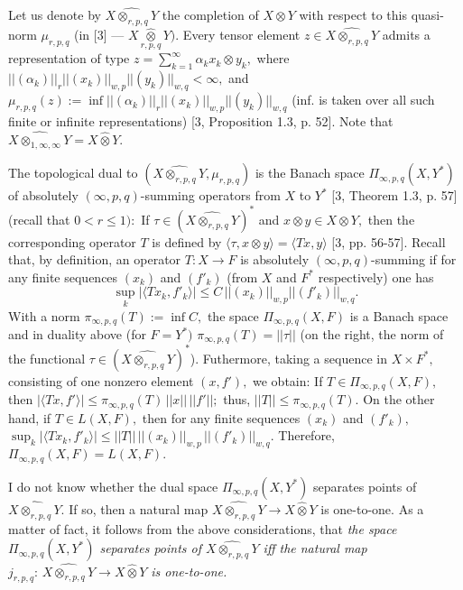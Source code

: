 Let us denote by $\widehat{X\otimes_{r,p,q} Y}$ the completion of $X\otimes Y$ with respect to
this quasi-norm $\mu_{r,p,q}$ (in [3] --- $X\underset{r,p,q}{\widehat\otimes} Y).$
Every tensor element $z\in \widehat{X\otimes_{r,p,q} Y}$
admits a representation of type
$z= \sum_{k=1}^\infty \alpha_k x_k\otimes y_k,$
where $||(\alpha_k)||_r ||(x_k)||_{w,p} ||(y_k)||_{w,q}<\infty,$ and
$\mu_{r,p,q}(z):= \inf ||(\alpha_k)||_r ||(x_k)||_{w,p} ||(y_k)||_{w,q}$
(inf. is taken over all such finite or infinite representations) [3, Proposition 1.3, p. 52].
Note that $\widehat{X\otimes_{1,\infty,\infty} Y}= X\widehat\otimes Y.$

The topological dual to $(\widehat{X\otimes_{r,p,q} Y}, \mu_{r,p,q})$ is the Banach space
$\Pi_{\infty,p,q}(X,Y^*)$ of absolutely $(\infty,p,q)$-summing operators
from $X$ to $Y^*$ [3, Theorem 1.3, p. 57]
(recall that $0<r\leqslant1):$ If $\tau\in (\widehat{X\otimes_{r,p,q} Y})^*$ and
$x\otimes y\in X\otimes Y,$ then the corresponding operator $T$
is defined by $\langle \tau, x\otimes y\rangle= \langle Tx, y\rangle$ [3, pp. 56-57].
Recall that, by definition, an operator $T: X\to F$ is
absolutely $(\infty,p,q)$-summing if for any finite sequences
$(x_k)$ and $(f'_k)$ (from $X$ and $F^*$ respectively) one has
$$ \sup_k |\langle Tx_k, f'_k\rangle|\leqslant C\, ||(x_k)||_{w,p} ||(f'_k)||_{w,q}.
$$
With a norm $\pi_{\infty,p,q}(T):= \inf C,$ the space
 $\Pi_{\infty,p,q}(X, F)$ is a Banach space and in duality above (for $F=Y^*)$
 $\pi_{\infty,p,q}(T)= ||\tau||$ (on the right, the norm of the functional
  $\tau\in(\widehat{X\otimes_{r,p,q} Y})^*$).
 Futhermore, taking a sequence in $X\times F^*,$ consisting of one nonzero element
 $(x,f'),$ we obtain: If $T\in \Pi_{\infty,p,q}(X, F),$ then
 $|\langle Tx, f'\rangle|\leqslant \pi_{\infty,p,q}(T)\, ||x||\, ||f'||;$
 thus, $||T||\leqslant \pi_{\infty,p,q}(T).$
  On the other hand, if $T\in L(X,F),$ then
for any finite sequences $(x_k)$ and $(f'_k),$ \,
$\sup_k |\langle Tx_k, f'_k\rangle|\leqslant
 ||T||\, ||(x_k)||_{w,p}\, ||(f'_k)||_{w,q}.$
 There\-fo\-re,
 $\Pi_{\infty,p,q}(X, F)= L(X, F).$

 I do not know whether the dual space $\Pi_{\infty,p,q}(X, Y^*)$ sepa\-ra\-tes
 points of $\widehat{X\otimes_{r,p,q} Y}.$ If so, then a natural map
   $\widehat{X\otimes_{r,p,q} Y}\to X\widehat\otimes Y$ is one-to-one. As a matter of fact,
   it follows from the above considerations, that
 {\it the space $\Pi_{\infty,p,q}(X, Y^*)$ separates
 points of $\widehat{X\otimes_{r,p,q} Y}$ iff the natural map
   $j_{r,p,q}:\, \widehat{X\otimes_{r,p,q} Y}\to X\widehat\otimes Y$ is one-to-one.}
       \smallskip

